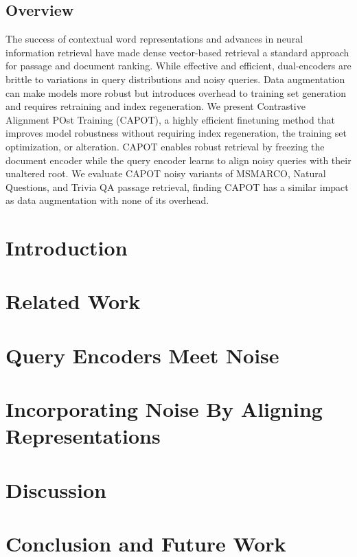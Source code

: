 \subsection{Overview}
The success of contextual word representations and advances in neural information retrieval have made dense vector-based retrieval a standard approach for passage and document ranking. While effective and efficient, dual-encoders are brittle to variations in query distributions and noisy queries. Data augmentation can make models more robust but introduces overhead to training set generation and requires retraining and index regeneration. We present Contrastive Alignment POst Training (CAPOT), a highly efficient finetuning method that improves model robustness without requiring index regeneration, the training set optimization, or alteration. CAPOT enables robust retrieval by freezing the document encoder while the query encoder learns to align noisy queries with their unaltered root. We evaluate CAPOT noisy variants of MSMARCO, Natural Questions, and Trivia QA passage retrieval, finding CAPOT has a similar impact as data augmentation with none of its overhead.

\section{Introduction}
\label{sec:intro}

\section{Related Work}
\label{sec:rel}

\section{Query Encoders Meet Noise}
\label{sec:create}

\section{Incorporating Noise By Aligning Representations}

\section{Discussion}

\section{Conclusion and Future Work}
